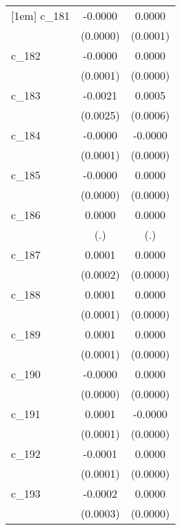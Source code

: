 {\begin{tabular}{l*{2}{c}}
[1em]
c\_181       &     -0.0000        &      0.0000        \\
            &    (0.0000)        &    (0.0001)        \\
[1em]
c\_182       &     -0.0000        &      0.0000        \\
            &    (0.0001)        &    (0.0000)        \\
[1em]
c\_183       &     -0.0021        &      0.0005        \\
            &    (0.0025)        &    (0.0006)        \\
[1em]
c\_184       &     -0.0000        &     -0.0000        \\
            &    (0.0001)        &    (0.0000)        \\
[1em]
c\_185       &     -0.0000        &      0.0000        \\
            &    (0.0000)        &    (0.0000)        \\
[1em]
c\_186       &      0.0000        &      0.0000        \\
            &         (.)        &         (.)        \\
[1em]
c\_187       &      0.0001        &      0.0000        \\
            &    (0.0002)        &    (0.0000)        \\
[1em]
c\_188       &      0.0001        &      0.0000        \\
            &    (0.0001)        &    (0.0000)        \\
[1em]
c\_189       &      0.0001        &      0.0000        \\
            &    (0.0001)        &    (0.0000)        \\
[1em]
c\_190       &     -0.0000        &      0.0000        \\
            &    (0.0000)        &    (0.0000)        \\
[1em]
c\_191       &      0.0001        &     -0.0000        \\
            &    (0.0001)        &    (0.0000)        \\
[1em]
c\_192       &     -0.0001        &      0.0000        \\
            &    (0.0001)        &    (0.0000)        \\
[1em]
c\_193       &     -0.0002        &      0.0000        \\
            &    (0.0003)        &    (0.0000)        \\

\end{tabular}}
